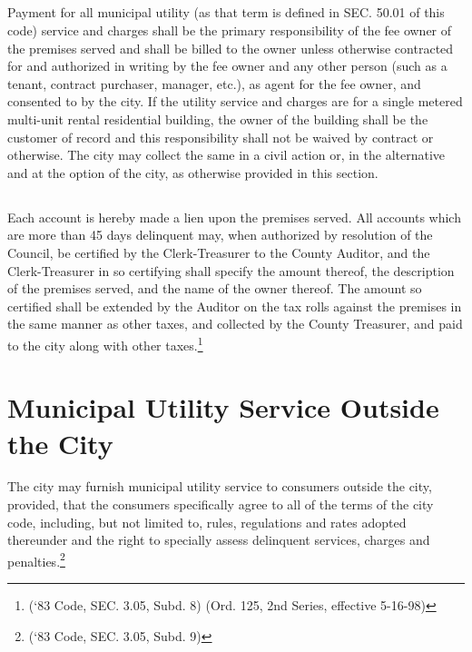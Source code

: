 \subsection{}
Payment for all municipal utility (as that term is defined in SEC. 50.01 of this code) service and charges shall be the primary responsibility of the fee owner of the premises served and shall be billed to the owner unless otherwise contracted for and authorized in writing by the fee owner and any other person (such as a tenant, contract purchaser, manager, etc.), as agent for the fee owner, and consented to by the city.  If the utility service and charges are for a single metered multi-unit rental residential building, the owner of the building shall be the customer of record and this responsibility shall not be waived by contract or otherwise.  The city may collect the same in a civil action or, in the alternative and at the option of the city, as otherwise provided in this section.
\subsection{}
Each account is hereby made a lien upon the premises served. All accounts which are more than 45 days delinquent may, when authorized by resolution of the Council, be certified by the Clerk-Treasurer to the County Auditor, and the Clerk-Treasurer in so certifying shall specify the amount thereof, the description of the premises served, and the name of the owner thereof. The amount so certified shall be extended by the Auditor on the tax rolls against the premises in the same manner as other taxes, and collected by the County Treasurer, and paid to the city along with other taxes.\footnote{(‘83 Code, SEC. 3.05, Subd. 8) (Ord. 125, 2nd Series, effective 5-16-98)}

\section{Municipal Utility Service Outside the City}
The city may furnish municipal utility service to consumers outside the city, provided, that the consumers specifically agree to all of the terms of the city code, including, but not limited to, rules, regulations and rates adopted thereunder and the right to specially assess delinquent services, charges and penalties.\footnote{(‘83 Code, SEC. 3.05, Subd. 9)}

